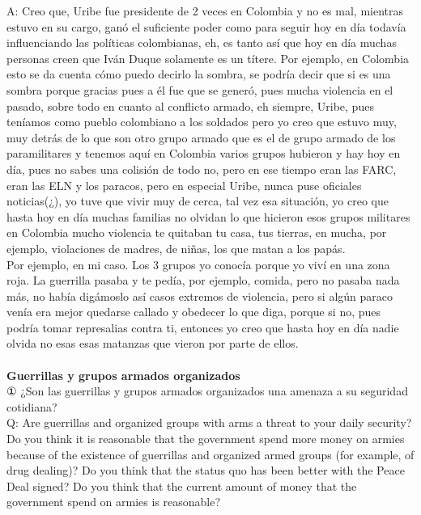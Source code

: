 \documentclass{phyasgn}\usepackage{nag}
\begin{document}
A: Creo que, Uribe fue presidente de 2 veces en Colombia y no es mal, mientras estuvo en su cargo, ganó el suficiente poder como para seguir hoy en día todavía influenciando las políticas colombianas, eh, es tanto así que hoy en día muchas personas creen que Iván Duque solamente es un títere. Por ejemplo, en Colombia esto se da cuenta cómo puedo decirlo la sombra, se podría decir que si es una sombra porque gracias pues a él fue que se generó, pues mucha violencia en el pasado, sobre todo en cuanto al conflicto armado, eh siempre, Uribe, pues teníamos como pueblo colombiano a los soldados pero yo creo que estuvo muy, muy detrás de lo que son otro grupo armado que es el de grupo armado de los paramilitares y tenemos aquí en Colombia varios grupos hubieron y hay hoy en día, pues no sabes una colisión de todo no, pero en ese tiempo eran las FARC, eran las ELN y los paracos, pero en especial Uribe, nunca puse oficiales noticias(¿), yo tuve que vivir muy de cerca, tal vez esa situación, yo creo que hasta hoy en día muchas familias no olvidan lo que hicieron esos grupos militares en Colombia mucho violencia te quitaban tu casa, tus tierras, en mucha, por ejemplo, violaciones de madres, de niñas, los que matan a los papás.\\
Por ejemplo, en mi caso. Los 3 grupos yo conocía porque yo viví en una zona roja. La guerrilla pasaba y te pedía, por ejemplo, comida, pero no pasaba nada más, no había digámoslo así casos extremos de violencia, pero si algún paraco venía era mejor quedarse callado y obedecer lo que diga, porque si no, pues podría tomar represalias contra ti, entonces yo creo que hasta hoy en día nadie olvida no esas esas matanzas que vieron por parte de ellos.\\
\\
\textbf{Guerrillas y grupos armados organizados}\\ 
① ¿Son las guerrillas y grupos armados organizados una amenaza a su seguridad cotidiana?\\
	Q: Are guerrillas and organized groups with arms a threat to your daily security? Do you think it is reasonable that the government spend more money on armies because of the existence of guerrillas and organized armed groups (for example, of drug dealing)? Do you think that the status quo has been better with the Peace Deal signed? Do you think that the current amount of money that the government spend on armies is reasonable?\\
\end{document}

